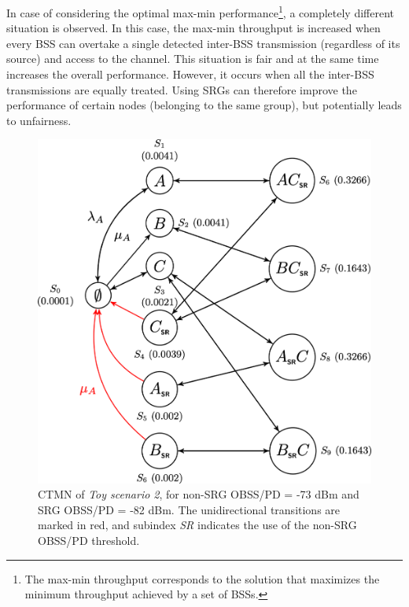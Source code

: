 \documentclass{ieeeaccess}
\begin{document}
In case of considering the optimal max-min performance\footnote{The max-min throughput corresponds to the solution that maximizes the minimum throughput achieved by a set of BSSs.}, a completely different situation is observed. In this case, the max-min throughput is increased when every BSS can overtake a single detected inter-BSS transmission (regardless of its source) and access to the channel. This situation is fair and at the same time increases the overall performance. However, it occurs when all the inter-BSS transmissions are equally treated. Using SRGs can therefore improve the performance of certain nodes (belonging to the same group), but potentially leads to unfairness. 
\begin{figure}[ht]
	\centering
	\includegraphics[width=.9\columnwidth]{ctmn_scenario_2}
	\caption{CTMN of \emph{Toy scenario 2}, for non-SRG OBSS/PD = -73 dBm and SRG OBSS/PD = -82 dBm. The unidirectional transitions are marked in red, and subindex \emph{SR} indicates the use of the non-SRG OBSS/PD threshold.}
	\label{fig:ctmn_scenario_2}
\end{figure}
\end{document}
